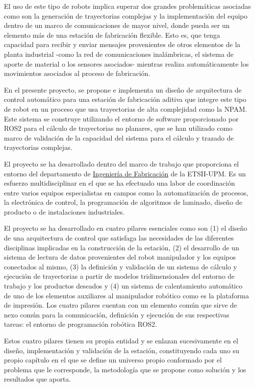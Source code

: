 El uso de este tipo de robots implica superar dos grandes problemáticas asociadas como son la generación de trayectorias complejas y la implementación del equipo dentro de un marco de comunicaciones de mayor nivel, donde pueda ser un elemento más de una estación de fabricación flexible. Esto es, que tenga capacidad para recibir y enviar mensajes provenientes de otros elementos de la planta industrial -como la red de comunicaciones inalámbricas, el sistema de aporte de material o los sensores asociados- mientras realiza automáticamente los movimientos asociados al proceso de fabricación.

En el presente proyecto, se propone e implementa un diseño de arquitectura de control automático para una estación de fabricación aditiva que integre este tipo de robot en un proceso que usa trayectorias de alta complejidad como la \acrfull{NPAM}. Este sistema se construye utilizando el entorno de software proporcionado por ROS2 para el cálculo de trayectorias no planares, que se han utilizado como marco de validación de la capacidad del sistema para el cálculo y trazado de trayectorias complejas.

El proyecto se ha desarrollado dentro del marco de trabajo que proporciona el entorno del departamento de \hyperlink{https://fabricacion.industriales.upm.es/}{Ingeniería de Fabricación} de la ETSII-UPM. Es un esfuerzo multidisciplinar en el que se ha efectuado una labor de coordinación entre varios equipos especialistas en campos como la automatización de procesos, la electrónica de control, la programación de algoritmos de laminado, diseño de producto o de instalaciones industriales.

El proyecto se ha desarrollado en cuatro pilares esenciales como son (1) el diseño de una arquitectura de control que satisfaga las necesidades de las diferentes disciplinas implicadas en la construcción de la estación, (2) el desarrollo de un sistema de lectura de datos provenientes del robot manipulador y los equipos conectados al mismo, (3) la definición y validación de un sistema de cálculo y ejecución de trayectorias a partir de modelos tridimensionales del entorno de trabajo y los productos deseados y (4) un sistema de calentamiento automático de uno de los elementos auxiliares al manipulador robótico como es la plataforma de impresión. Los cuatro pilares cuentan con un elemento común que sirve de nexo común para la comunicación, definición y ejecución de sus respectivas tareas: el entorno de programación robótica ROS2.

Estos cuatro pilares tienen su propia entidad y se enlazan sucesivamente en el diseño, implementación y validación de la estación, constituyendo cada uno su propio capítulo en el que se define un universo propio conformado por el problema que le corresponde, la metodología que se propone como solución y los resultados que aporta.

